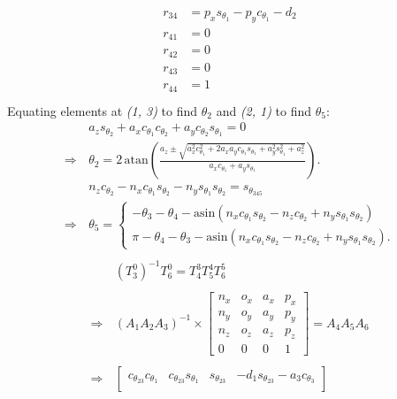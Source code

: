 \documentclass[11pt,a4paper, titlepage]{article}
\begin{document}
\begin{appendices}
\begin{align*}
\begin{split}
r_{34} &= p_xs_{\theta_1} - p_yc_{\theta_1} - d_2\\
r_{41} &= 0\\
r_{42} &= 0\\
r_{43} &= 0\\
r_{44} &= 1\\
\end{split}
\end{align*}
\newpage
Equating elements at \textit{(1, 3)} to find $\theta_2$ and \textit{(2, 1)} to find $\theta_5$: \\
\begin{align*}
&a_zs_{\theta_2} + a_xc_{\theta_1}c_{\theta_2} + a_yc_{\theta_2}s_{\theta_1} = 0 \\[10pt]
\Rightarrow\, &\theta_2 = 2\,\mathrm{atan}\left(\frac{a_z \pm \sqrt{a_x^2c_{\theta_1}^2+2a_xa_yc_{\theta_1}s_{\theta_1}+a_y^2s_{\theta_1}^2+a_z^2}}{a_xc_{\theta_1} + a_ys_{\theta_1}}\right). \\[10pt]
&n_zc_{\theta_2} - n_xc_{\theta_1}s_{\theta_2} - n_ys_{\theta_1}s_{\theta_2} = s_{\theta_{345}} \\[10pt]
\Rightarrow\, &\theta_5 = 
\begin{cases}
-\theta_3 - \theta_4 - \mathrm{asin}(n_xc_{\theta_1}s_{\theta_2} - n_zc_{\theta_2} + n_ys_{\theta_1}s_{\theta_2}) \\[5pt]
\pi - \theta_4 - \theta_3 - \mathrm{asin}(n_xc_{\theta_1}s_{\theta_2} - n_zc_{\theta_2} + n_ys_{\theta_1}s_{\theta_2}).
\end{cases} \\
\end{align*}
\newpage
\begin{equation*}
\begin{split}
&(T_{3}^{0})^{-1}T_{6}^{0} =
T_{4}^{3}T_{5}^{4}T_{6}^{5} \\\\
\Rightarrow \, &(A_{1}A_{2}A_{3})^{-1} \times
\begin{bmatrix}
n_x & o_x & a_x & p_x \\
n_y & o_y & a_y & p_y \\
n_z & o_z & a_z & p_z \\
0 & 0 & 0 & 1	
\end{bmatrix} = A_4 A_5 A_6 \\\\
\Rightarrow\, &\begin{bmatrix}
c_{\theta_{23}}c_{\theta_1} & c_{\theta_{23}}s_{\theta_1} & s_{\theta_{23}} & -d_1s_{\theta_{23}} - a_3c_{\theta_3} \\

\end{bmatrix}
\end{split}
\end{equation*}
\end{appendices}
\end{document}
